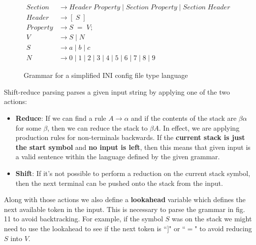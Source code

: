 \documentclass[12pt, letterpaper]{article}
\theoremstyle{definition}
\begin{document}
\begin{figure}[h]
    \begin{center}
        \begin{equation}
            \begin{split}
                Section &\rightarrow Header\;Property\;|\;Section\;Property\;|\;Section\;Header\\
                Header &\rightarrow [\;S\;]\\
                Property &\rightarrow S\;=\;V;\\
                V &\rightarrow S\;|\;N\\
                S &\rightarrow a\;|\;b\;|\;c\\
                N &\rightarrow 0\;|\;1\;|\;2\;|\;3\;|\;4\;|\;5\;|\;6\;|\;7\;|\;8\;|\;9
            \end{split}
            \nonumber
        \end{equation}
    \end{center}
    \vspace{-1em}
    \caption{Grammar for a simplified INI config file type language}
\end{figure}

Shift-reduce parsing parses a given input string by applying one of the two actions:

\begin{itemize}
    \item \textbf{Reduce}: If we can find a rule $A \rightarrow \alpha$ and if the contents of the stack are $\beta\alpha$ for some $\beta$, then we can reduce the stack to $\beta A$. In effect, we are applying production rules for non-terminals backwards. If the \textbf{current stack is just the start symbol} and \textbf{no input is left}, then this means that given input is a valid sentence within the language defined by the given grammar.
    \item \textbf{Shift}: If it's not possible to perform a reduction on the current stack symbol, then the next terminal can be pushed onto the stack from the input.
\end{itemize}

Along with those actions we also define a \textbf{lookahead} variable which defines the next available token in the input. This is necessary to parse the grammar in fig. 11 to avoid backtracking. For example, if the symbol $S$ was on the stack we might need to use the lookahead to see if the next token is ``$]$" or ``$=$" to avoid reducing $S$ into $V$.
\end{document}
